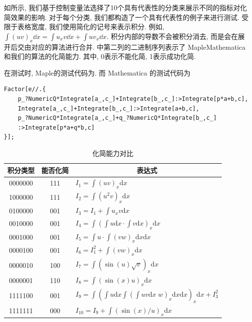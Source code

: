 如所示, 我们基于控制变量法选择了10个具有代表性的分类来展示不同的指标对化简效果的影响. 对于每个分类, 我们都构造了一个具有代表性的例子来进行测试. 受限于表格宽度, 我们使用简化的记号来表示积分. 例如, $\int\!{(uv)_x\dd x}=\int\!{u_xv\dd x}+\int\!{uv_x\dd x}$. 积分内部的导数不会被积分消去, 而是会在展开后交由对应的算法进行合并. 中第二列的二进制序列表示了 Maple\D Mathematica 和我们的算法的化简能力. 其中, 0表示不能化简, 1表示成功化简. 

在测试时, Maple的测试代码为. 而 Mathematica 的测试代码为
\begin{verbatim}
Factor[e//.{
    p_?NumericQ*Integrate[a_,c_]+Integrate[b_,c_]:>Integrate[p*a+b,c],
    Integrate[a_,c_]+Integrate[b_,c_]:>Integrate[a+b,c],
    p_?NumericQ*Integrate[a_,c_]+q_?NumericQ*Integrate[b_,c_]
    :>Integrate[p*a+q*b,c]
}];
\end{verbatim}

\begin{table}[htbp]
\renewcommand{\arraystretch}{1.25}
\centering
\caption{化简能力对比} \label{tb1}
\renewcommand{\dd}[1]{\mathrm{d}#1}
\renewcommand{\ii}[1]{\int\!{#1\dd x}}
\begin{tabular}{ccl}
\hline
积分类型 & 能否化简 & \multicolumn{1}{c}{表达式} \\
\hline
0000000 & 111 & $I_1=\int\!{(uv)_x\dd x}$\\ 
1000000 & 111 & $I_2=\int\!{(u^2v)_x\dd x}$\\ 
0100000 & 001 & $I_3=I_1+\int\!{u_xv\dd x}$\\ 
0010000 & 001 & $I_4=\int\!{(\int\!{u\dd x}\cdot \int\!{v\dd x})_x\dd x}$\\
0001000 & 001 & $I_5=\int\!{u\cdot \int\!{(vw)_x\dd x}\dd x}$\\
0000100 & 001 & $I_6=I_1^2+\int\!{(vw)_x\dd x}$\\
0000010 & 100 & $I_7=\int\!{(\sin(u)\sqrt{v})_x\dd x}$\\
0000001 & 110 & $I_8=\int\!{(\sin(x)u)_x\dd x}$\\
1111100 & 001 & $I_9=\int\!{(\int\!{u\dd x}\int\!{(\int\!{uv\dd x}\;w)_x\dd x\dd x})_x\dd x}+I_3^2$\\
1111111 & 000 & $I_{10}=I_9+\int\!{(\sin(x)/u)_x\dd x}$\\
\hline
\end{tabular}
\end{table} 

